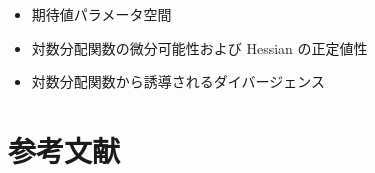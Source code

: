 \documentclass[report]{jlreq}
\begin{document}
\begin{itemize}
    \item 期待値パラメータ空間
    \item 対数分配関数の微分可能性および Hessian の正定値性
    \item 対数分配関数から誘導されるダイバージェンス
\end{itemize}


%
\section{参考文献}

\nocite{amari_information_2016}
\nocite{wainwright_graphical_2007}
\nocite{bn1970_pdf}

{
    \renewcommand{\bibsection}{}
    
    
}
\end{document}
